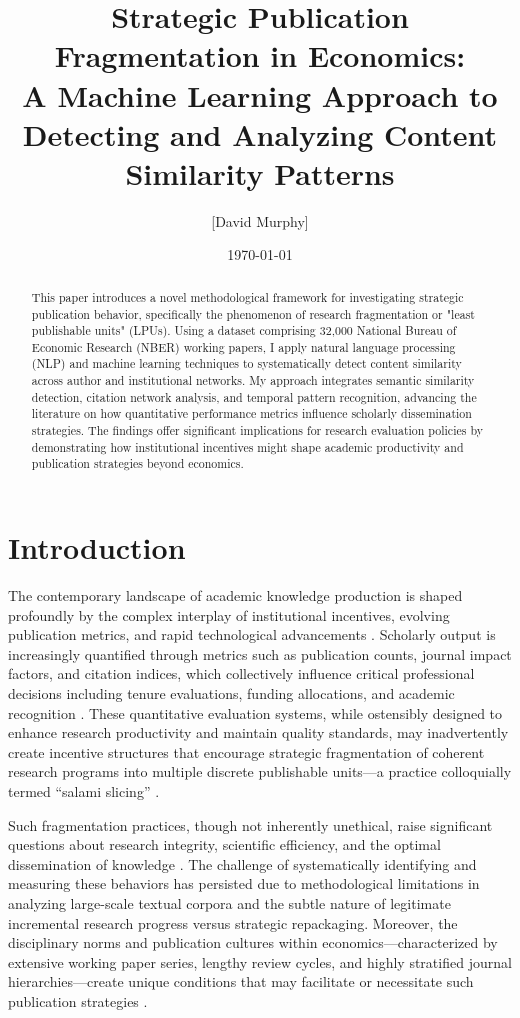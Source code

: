 \documentclass[12pt]{article}
\title{Strategic Publication Fragmentation in Economics:\\
A Machine Learning Approach to Detecting and Analyzing Content Similarity Patterns}
\author{[David Murphy]}
\date{\today}
\begin{document}
\maketitle

\begin{abstract}
This paper introduces a novel methodological framework for investigating strategic publication behavior, specifically the phenomenon of research fragmentation or "least publishable units" (LPUs). Using a dataset comprising 32,000 National Bureau of Economic Research (NBER) working papers, I apply natural language processing (NLP) and machine learning techniques to systematically detect content similarity across author and institutional networks. My approach integrates semantic similarity detection, citation network analysis, and temporal pattern recognition, advancing the literature on how quantitative performance metrics influence scholarly dissemination strategies. The findings offer significant implications for research evaluation policies by demonstrating how institutional incentives might shape academic productivity and publication strategies beyond economics.
\end{abstract}

\section{Introduction}

The contemporary landscape of academic knowledge production is shaped profoundly by the complex interplay of institutional incentives, evolving publication metrics, and rapid technological advancements \citep{good2019publish, anderson2021tenure, weingart2005impact, moosa2018publish}. Scholarly output is increasingly quantified through metrics such as publication counts, journal impact factors, and citation indices, which collectively influence critical professional decisions including tenure evaluations, funding allocations, and academic recognition \citep{johnson2019incentives, hamermesh2018citations}. These quantitative evaluation systems, while ostensibly designed to enhance research productivity and maintain quality standards, may inadvertently create incentive structures that encourage strategic fragmentation of coherent research programs into multiple discrete publishable units—a practice colloquially termed ``salami slicing'' \citep{broad1981fraud, crawford2007salami, smith2020fragmentation}.

Such fragmentation practices, though not inherently unethical, raise significant questions about research integrity, scientific efficiency, and the optimal dissemination of knowledge \citep{weingart2005impact, hamermesh2018citations, bornmann2012standards}. The challenge of systematically identifying and measuring these behaviors has persisted due to methodological limitations in analyzing large-scale textual corpora and the subtle nature of legitimate incremental research progress versus strategic repackaging. Moreover, the disciplinary norms and publication cultures within economics—characterized by extensive working paper series, lengthy review cycles, and highly stratified journal hierarchies—create unique conditions that may facilitate or necessitate such publication strategies \citep{ellison2002evolving}.
\end{document}

